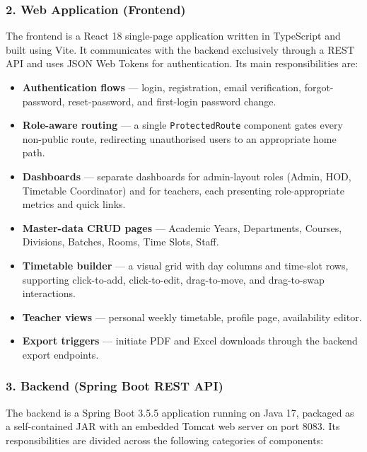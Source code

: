 \subsubsection{2. Web Application (Frontend)}

The frontend is a React 18 single-page application written in TypeScript and built using Vite. It communicates with the backend exclusively through a REST API and uses JSON Web Tokens for authentication. Its main responsibilities are:

\begin{itemize}
    \item \textbf{Authentication flows} --- login, registration, email verification, forgot-password, reset-password, and first-login password change.
    \item \textbf{Role-aware routing} --- a single \texttt{ProtectedRoute} component gates every non-public route, redirecting unauthorised users to an appropriate home path.
    \item \textbf{Dashboards} --- separate dashboards for admin-layout roles (Admin, HOD, Timetable Coordinator) and for teachers, each presenting role-appropriate metrics and quick links.
    \item \textbf{Master-data CRUD pages} --- Academic Years, Departments, Courses, Divisions, Batches, Rooms, Time Slots, Staff.
    \item \textbf{Timetable builder} --- a visual grid with day columns and time-slot rows, supporting click-to-add, click-to-edit, drag-to-move, and drag-to-swap interactions.
    \item \textbf{Teacher views} --- personal weekly timetable, profile page, availability editor.
    \item \textbf{Export triggers} --- initiate PDF and Excel downloads through the backend export endpoints.
\end{itemize}

\subsubsection{3. Backend (Spring Boot REST API)}

The backend is a Spring Boot 3.5.5 application running on Java 17, packaged as a self-contained JAR with an embedded Tomcat web server on port 8083. Its responsibilities are divided across the following categories of components:

